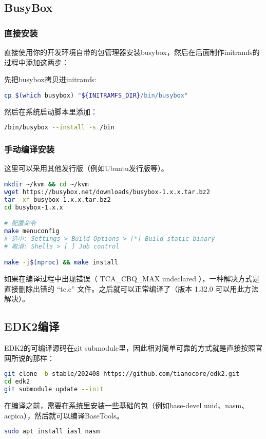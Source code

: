 \subsection{BusyBox}
\subsubsection{直接安装}
直接使用你的开发环境自带的包管理器安装busybox，然后在后面制作initramfs的过程中添加这两步：

先把busybox拷贝进initramfs:
\begin{lstlisting}[language=bash]
cp $(which busybox) "${INITRAMFS_DIR}/bin/busybox"
\end{lstlisting}

然后在系统启动脚本里添加：
\begin{lstlisting}[language=bash]
/bin/busybox --install -s /bin
\end{lstlisting}
\subsubsection{手动编译安装}
这里可以采用其他发行版（例如Ubuntu发行版等）。
\begin{lstlisting}[language=bash]
mkdir ~/kvm && cd ~/kvm
wget https://busybox.net/downloads/busybox-1.x.x.tar.bz2
tar -xf busybox-1.x.x.tar.bz2
cd busybox-1.x.x

# 配置命令
make menuconfig
# 选中: Settings > Build Options > [*] Build static binary
# 取消: Shells > [ ] Job control

make -j$(nproc) && make install
\end{lstlisting}
如果在编译过程中出现错误（ TCA\_CBQ\_MAX undeclared ），一种解决方式是直接删除出错的 “tc.c” 文件。之后就可以正常编译了（版本 1.32.0 可以用此方法解决）。

\subsection{EDK2编译}
EDK2的可编译源码在git submodule里，因此相对简单可靠的方式就是直接按照官网所说的那样：
\begin{lstlisting}[language=bash]
git clone -b stable/202408 https://github.com/tianocore/edk2.git
cd edk2
git submodule update --init
\end{lstlisting}

在编译之前，需要在系统里安装一些基础的包（例如base-devel uuid、nasm、acpica），然后就可以编译BaseTools。

\begin{lstlisting}[language=bash]
    sudo apt install iasl nasm
\end{lstlisting}

